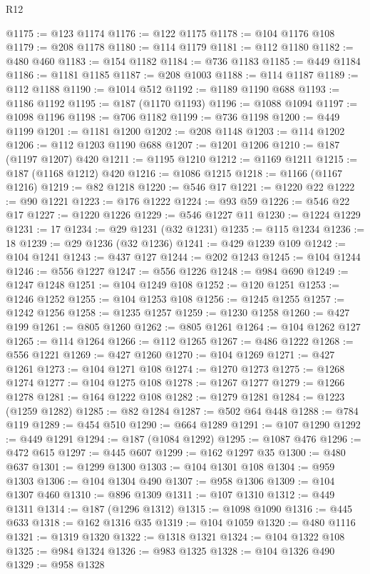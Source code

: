 \begin{lexlean}{R12}
\begin{coremodule}
@1175 := @123 @1174
@1176 := @122 @1175
@1178 := @104 @1176 @108
@1179 := @208 @1178
@1180 := @114 @1179
@1181 := @112 @1180
@1182 := @480 @460
@1183 := @154 @1182
@1184 := @736 @1183
@1185 := @449 @1184
@1186 := @1181 @1185
@1187 := @208 @1003
@1188 := @114 @1187
@1189 := @112 @1188
@1190 := @1014 @512
@1192 := @1189 @1190 @688
@1193 := @1186 @1192
@1195 := @187 (@1170 @1193)
@1196 := @1088 @1094
@1197 := @1098 @1196
@1198 := @706 @1182
@1199 := @736 @1198
@1200 := @449 @1199
@1201 := @1181 @1200
@1202 := @208 @1148
@1203 := @114 @1202
@1206 := @112 @1203 @1190 @688
@1207 := @1201 @1206
@1210 := @187 (@1197 @1207) @420
@1211 := @1195 @1210
@1212 := @1169 @1211
@1215 := @187 (@1168 @1212) @420
@1216 := @1086 @1215
@1218 := @1166 (@1167 @1216)
@1219 := @82 @1218
@1220 := @546 @17
@1221 := @1220 @22
@1222 := @90 @1221
@1223 := @176 @1222
@1224 := @93 @59
@1226 := @546 @22 @17
@1227 := @1220 @1226
@1229 := @546 @1227 @11
@1230 := @1224 @1229
@1231 := 17
@1234 := @29 @1231 (@32 @1231)
@1235 := @115 @1234
@1236 := 18
@1239 := @29 @1236 (@32 @1236)
@1241 := @429 @1239 @109
@1242 := @104 @1241
@1243 := @437 @127
@1244 := @202 @1243
@1245 := @104 @1244
@1246 := @556 @1227
@1247 := @556 @1226
@1248 := @984 @690
@1249 := @1247 @1248
@1251 := @104 @1249 @108
@1252 := @120 @1251
@1253 := @1246 @1252
@1255 := @104 @1253 @108
@1256 := @1245 @1255
@1257 := @1242 @1256
@1258 := @1235 @1257
@1259 := @1230 @1258
@1260 := @427 @199
@1261 := @805 @1260
@1262 := @805 @1261
@1264 := @104 @1262 @127
@1265 := @114 @1264
@1266 := @112 @1265
@1267 := @486 @1222
@1268 := @556 @1221
@1269 := @427 @1260
@1270 := @104 @1269
@1271 := @427 @1261
@1273 := @104 @1271 @108
@1274 := @1270 @1273
@1275 := @1268 @1274
@1277 := @104 @1275 @108
@1278 := @1267 @1277
@1279 := @1266 @1278
@1281 := @164 @1222 @108
@1282 := @1279 @1281
@1284 := @1223 (@1259 @1282)
@1285 := @82 @1284
@1287 := @502 @64 @448
@1288 := @784 @119
@1289 := @454 @510
@1290 := @664 @1289
@1291 := @107 @1290
@1292 := @449 @1291
@1294 := @187 (@1084 @1292)
@1295 := @1087 @476
@1296 := @472 @615
@1297 := @445 @607
@1299 := @162 @1297 @35
@1300 := @480 @637
@1301 := @1299 @1300
@1303 := @104 @1301 @108
@1304 := @959 @1303
@1306 := @104 @1304 @490
@1307 := @958 @1306
@1309 := @104 @1307 @460
@1310 := @896 @1309
@1311 := @107 @1310
@1312 := @449 @1311
@1314 := @187 (@1296 @1312)
@1315 := @1098 @1090
@1316 := @445 @633
@1318 := @162 @1316 @35
@1319 := @104 @1059
@1320 := @480 @1116
@1321 := @1319 @1320
@1322 := @1318 @1321
@1324 := @104 @1322 @108
@1325 := @984 @1324
@1326 := @983 @1325
@1328 := @104 @1326 @490
@1329 := @958 @1328

\end{coremodule}
\end{lexlean}
